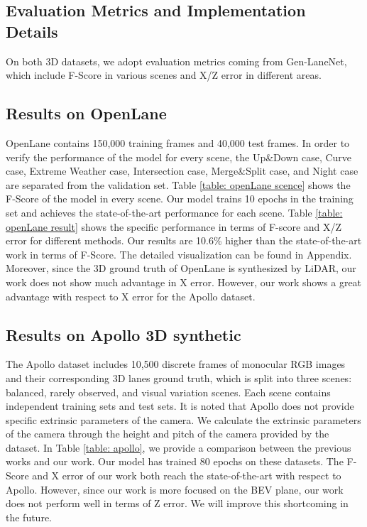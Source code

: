\documentclass[10pt,twocolumn,letterpaper]{article}
\begin{document}
\subsection{Evaluation Metrics and Implementation Details}

On both 3D datasets, we adopt evaluation metrics coming from Gen-LaneNet\cite{guo2020gen}, which include F-Score in various scenes and X/Z error in different areas.
\subsection{Results on OpenLane}
\label{subsec: openlane}
OpenLane contains 150,000 training frames and 40,000 test frames. In order to verify the performance of the model for every scene, the Up\&Down case, Curve case, Extreme Weather case, Intersection case, Merge\&Split case, and Night case are separated from the validation set.  Table \ref{table: openLane scence} shows the F-Score of the model in every scene. Our model trains 10 epochs in the training set and achieves the state-of-the-art performance for each scene. Table \ref{table: openLane result} shows the specific performance in terms of F-score and X/Z error for different methods. Our results are 10.6\% higher than the state-of-the-art work\cite{chen2022persformer} in terms of F-Score. The detailed visualization can be found in Appendix. Moreover, since the 3D ground truth of OpenLane is synthesized by LiDAR, our work does not show much advantage in X error. However, our work shows a great advantage with respect to X error for the Apollo dataset\cite{guo2020gen}.



\subsection{Results on Apollo 3D synthetic}
\label{subsec: apollo}
The Apollo dataset \cite{guo2020gen} includes 10,500 discrete frames of monocular RGB images and their corresponding 3D lanes ground truth, which is split into three scenes: balanced, rarely observed, and visual variation scenes. Each scene contains independent training sets and test sets. It is noted that Apollo does not provide specific extrinsic parameters of the camera. We calculate the extrinsic parameters of the camera through the height and pitch of the camera provided by the dataset. In Table \ref{table: apollo}, we provide a comparison between the previous works and our work. Our model has trained 80 epochs on these datasets. The F-Score and X error of our work both reach the state-of-the-art with respect to Apollo. However, since our work is more focused on the BEV plane, our work does not perform well in terms of Z error. We will improve this shortcoming in the future.
\end{document}
